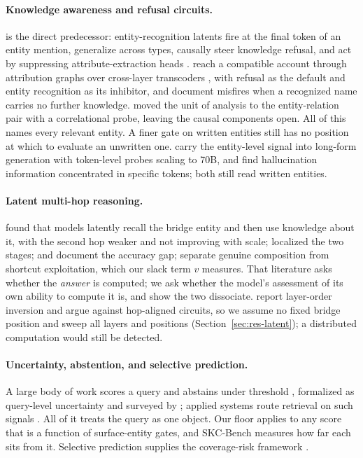 \documentclass{article}
\begin{document}
\paragraph{Knowledge awareness and refusal circuits.} \citet{ferrando2025entity} is the direct
predecessor: entity-recognition latents fire at the final token of an entity mention, generalize
across types, causally steer knowledge refusal, and act by suppressing attribute-extraction heads
\citep{geva2023dissecting,nanda2023factfinding}. \citet{lindsey2025biology} reach a compatible
account through attribution graphs over cross-layer transcoders
\citep{ameisen2025circuittracing,marks2025sparsecircuits}, with refusal as the default and entity
recognition as its inhibitor, and document misfires when a recognized name carries no further
knowledge. \citet{tamoyan2025factual} moved the unit of analysis to the entity-relation pair with a
correlational probe, leaving the causal components open. All of this names every relevant entity. A
finer gate on written entities still has no position at which to evaluate an unwritten one.
\citet{obeso2025realtime} carry the entity-level signal into long-form generation with token-level
probes scaling to 70B, and \citet{orgad2025intrinsic} find hallucination information concentrated in
specific tokens; both still read written entities.

\paragraph{Latent multi-hop reasoning.} \citet{yang2024latent} found that models latently recall the
bridge entity and then use knowledge about it, with the second hop weaker and not improving with
scale; \citet{biran2024hopping} localized the two stages; \citet{balesni2024twohop} and
\citet{press2023compositionality} document the accuracy gap; \citet{yang2024shortcuts} separate
genuine composition from shortcut exploitation, which our slack term $v$ measures. That literature
asks whether the \emph{answer} is computed; we ask whether the model's assessment of its own ability
to compute it is, and show the two dissociate. \citet{layerorder2026} report layer-order inversion
and argue against hop-aligned circuits, so we assume no fixed bridge position and sweep all layers
and positions (Section~\ref{sec:res-latent}); a distributed computation would still be detected.

\paragraph{Uncertainty, abstention, and selective prediction.} A large body of work scores a query
and abstains under threshold
\citep{kadavath2022know,azaria2023internal,burns2023discovering,chen2024inside,ji2024internal,gottesman2024estimating,kossen2024semantic},
formalized as query-level uncertainty \citep{chen2026querylevel} and surveyed by
\citet{wen2025abstention}; applied systems route retrieval on such signals \citep{yao2025seakr}.
All of it treats the query as one object. Our floor applies to any score that is a function of
surface-entity gates, and SKC-Bench measures how far each sits from it. Selective prediction
supplies the coverage-risk framework \citep{elyaniv2010foundations,geifman2017selective}.
\end{document}
